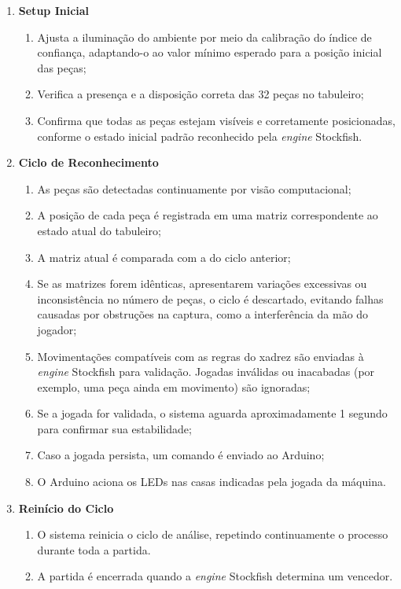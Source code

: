 \documentclass[journal]{IEEEtran} %
\begin{document}
\begin{enumerate}
    \item \textbf{Setup Inicial}
    \begin{enumerate}
        \item Ajusta a iluminação do ambiente por meio da calibração do índice de confiança, adaptando-o ao valor mínimo esperado para a posição inicial das peças;
        \item Verifica a presença e a disposição correta das 32 peças no tabuleiro;
        \item Confirma que todas as peças estejam visíveis e corretamente posicionadas, conforme o estado inicial padrão reconhecido pela \textit{engine} Stockfish.
    \end{enumerate}

    \item \textbf{Ciclo de Reconhecimento}
    \begin{enumerate}
        \item As peças são detectadas continuamente por visão computacional;
        \item A posição de cada peça é registrada em uma matriz correspondente ao estado atual do tabuleiro;
        \item A matriz atual é comparada com a do ciclo anterior;
        \item Se as matrizes forem idênticas, apresentarem variações excessivas ou inconsistência no número de peças, o ciclo é descartado, evitando falhas causadas por obstruções na captura, como a interferência da mão do jogador;
        \item Movimentações compatíveis com as regras do xadrez são enviadas à \textit{engine} Stockfish para validação. Jogadas inválidas ou inacabadas (por exemplo, uma peça ainda em movimento) são ignoradas;
        \item Se a jogada for validada, o sistema aguarda aproximadamente 1 segundo para confirmar sua estabilidade;
        \item Caso a jogada persista, um comando é enviado ao Arduino;
        \item O Arduino aciona os LEDs nas casas indicadas pela jogada da máquina.
    \end{enumerate}

    \item \textbf{Reinício do Ciclo}
    \begin{enumerate}
        \item O sistema reinicia o ciclo de análise, repetindo continuamente o processo durante toda a partida.
        \item A partida é encerrada quando a \textit{engine} Stockfish determina um vencedor.
    \end{enumerate}
\end{enumerate}
\end{document}
